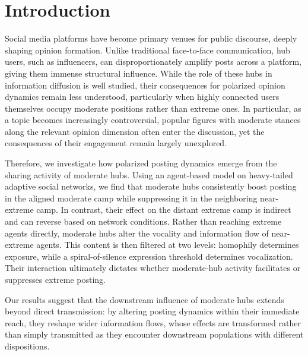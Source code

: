 \documentclass{svproc}
\def\Blue{\color[rgb]{0,0,1}}
\def\Black{\color[rgb]{0,0,0}}
\begin{document}
\begin{abstract}
\Black
{} 
\end{abstract}

\Blue


\section{Introduction}\label{sec:intro}
Social media platforms have become primary venues for public
discourse, deeply shaping opinion formation. Unlike traditional
face-to-face communication, hub users, such as influencers, can
disproportionately amplify posts across a platform, giving them
immense structural influence. While the role of these hubs in
information diffusion is well studied, their consequences for
polarized opinion dynamics remain less understood, particularly when
highly connected users themselves occupy moderate positions rather
than extreme ones. In particular, as a topic becomes increasingly
controversial, popular figures with moderate stances along the
relevant opinion dimension often enter the discussion, yet the
consequences of their engagement remain largely unexplored.
\par


Therefore, we investigate how polarized posting dynamics emerge from
the sharing activity of moderate hubs. Using an agent-based model on
heavy-tailed adaptive social networks, we find that moderate hubs
consistently boost posting in the aligned moderate camp while
suppressing it in the neighboring near-extreme camp. In contrast,
their effect on the distant extreme camp is indirect and can reverse
based on network conditions. Rather than reaching extreme agents
directly, moderate hubs alter the vocality and information flow of
near-extreme agents. This content is then filtered at two levels:
homophily determines exposure, while a spiral-of-silence expression
threshold determines vocalization. Their interaction ultimately
dictates whether moderate-hub activity facilitates or suppresses
extreme posting.
\par

Our results suggest that the downstream influence of moderate hubs
extends beyond direct transmission: by altering posting dynamics
within their immediate reach, they reshape wider information flows,
whose effects are transformed rather than simply transmitted as they
encounter downstream populations with different dispositions.
\end{document}
